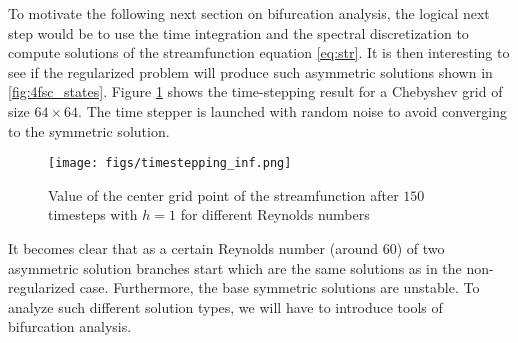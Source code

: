 To motivate the following next section on bifurcation analysis, the logical next
step would be to use the time integration and the spectral discretization to
compute solutions of the streamfunction equation \eqref{eq:str}. It is then
interesting to see if the regularized problem will produce such asymmetric
solutions shown in \ref{fig:4fsc_states}. Figure \ref{fig:timestepping} shows
the time-stepping result for a Chebyshev grid of size $64 \times 64$. The time
stepper is launched with random noise to avoid converging to the symmetric
solution.

\begin{figure}[ht!]
\begin{center}
  \texttt{[image: figs/timestepping\_inf.png]}
\end{center}
\caption{Value of the center grid point of the streamfunction after $150$
  timesteps with $h=1$ for different Reynolds numbers}
\label{fig:timestepping}
\end{figure}

It becomes clear that as a certain Reynolds number (around $60$) of two
asymmetric solution branches start which are the same solutions as in the
non-regularized case. Furthermore, the base symmetric solutions are unstable.
To analyze such different solution types, we will have to introduce tools of
bifurcation analysis.
